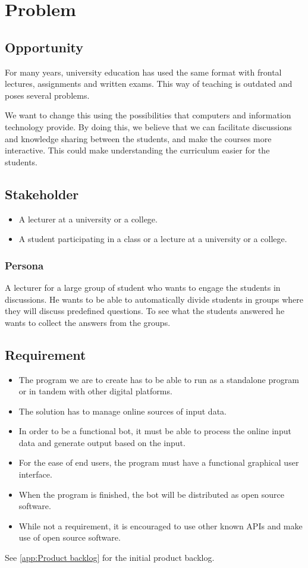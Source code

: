\section{Problem}

\subsection{Opportunity}
For many years, university education has used the same format with frontal lectures, assignments and written exams. This way of teaching is outdated and poses several problems. 

We want to change this using the possibilities that computers and information technology provide. By doing this, we believe that we can facilitate discussions and knowledge sharing between the students, and make the courses more interactive. This could make understanding the curriculum easier for the students.


\subsection{Stakeholder}
\begin{itemize}
    \item A lecturer at a university or a college.
    \item A student participating in a class or a lecture at a university or a college.
\end{itemize} 

\subsubsection{Persona}
A lecturer for a large group of student who wants to engage the students in discussions. He wants to be able to automatically divide students in groups where they will discuss predefined questions. To see what the students answered he wants to collect the answers from the groups. 

\subsection{Requirement}
\begin{itemize}
    \item The program we are to create has to be able to run as a standalone program or in tandem with other digital platforms.
    \item The solution has to manage online sources of input data.
    \item In order to be a functional bot, it must be able to process the online input data and generate output based on the input.
    \item For the ease of end users, the program must have a functional graphical user interface.
    \item When the program is finished, the bot will be distributed as open source software.
    \item While not a requirement, it is encouraged to use other known APIs and make use of open source software.
\end{itemize}

See \cref{app:Product backlog} for the initial product backlog.